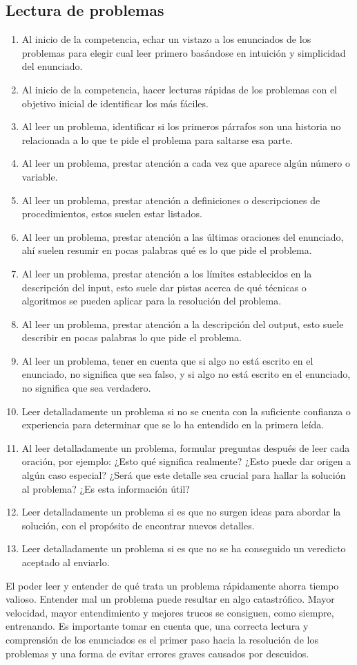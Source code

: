 \subsection{Lectura de problemas}
\begin{enumerate}[resume=icpc]
    \item Al inicio de la competencia, echar un vistazo a los enunciados de los problemas para elegir cual leer primero basándose en intuición y simplicidad del enunciado.
    \item Al inicio de la competencia, hacer lecturas rápidas de los problemas con el objetivo inicial de identificar los más fáciles.
    \item Al leer un problema, identificar si los primeros párrafos son una historia no relacionada a lo que te pide el problema para saltarse esa parte.
    \item Al leer un problema, prestar atención a cada vez que aparece algún número o variable.
    \item Al leer un problema, prestar atención a definiciones o descripciones de procedimientos, estos suelen estar listados.
    \item Al leer un problema, prestar atención a las últimas oraciones del enunciado, ahí suelen resumir en pocas palabras qué es lo que pide el problema.
    \item Al leer un problema, prestar atención a los límites establecidos en la descripción del input, esto suele dar pistas acerca de qué técnicas o algoritmos se pueden aplicar para la resolución del problema.
    \item Al leer un problema, prestar atención a la descripción del output, esto suele describir en pocas palabras lo que pide el problema.
    \item Al leer un problema, tener en cuenta que si algo no está escrito en el enunciado, no significa que sea falso, y si algo no está escrito en el enunciado, no significa que sea verdadero.
    \item Leer detalladamente un problema si no se cuenta con la suficiente confianza o experiencia para determinar que se lo ha entendido en la primera leída.
    \item Al leer detalladamente un problema, formular preguntas después de leer cada oración, por ejemplo: ¿Esto qué significa realmente? ¿Esto puede dar origen a algún caso especial? ¿Será que este detalle sea crucial para hallar la solución al problema? ¿Es esta información útil?
    \item Leer detalladamente un problema si es que no surgen ideas para abordar la solución, con el propósito de encontrar nuevos detalles.
    \item Leer detalladamente un problema si es que no se ha conseguido un veredicto aceptado al enviarlo.
\end{enumerate}
El poder leer y entender de qué trata un problema rápidamente ahorra tiempo valioso. Entender mal un problema puede resultar en algo catastrófico. Mayor velocidad, mayor entendimiento y mejores trucos se consiguen, como siempre, entrenando. Es importante tomar en cuenta que, una correcta lectura y comprensión de los enunciados es el primer paso hacia la resolución de los problemas y una forma de evitar errores graves causados por descuidos.
\pagebreak
